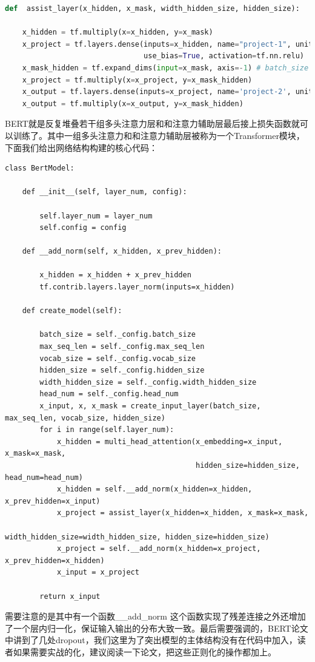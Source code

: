 \documentclass[twoside,a4paper,12pt]{book}%
\begin{document}
\begin{lstlisting}[language={Python}]
def  assist_layer(x_hidden, x_mask, width_hidden_size, hidden_size):

    x_hidden = tf.multiply(x=x_hidden, y=x_mask)
    x_project = tf.layers.dense(inputs=x_hidden, name="project-1", units=width_hidden_size, 
                                use_bias=True, activation=tf.nn.relu)
    x_mask_hidden = tf.expand_dims(input=x_mask, axis=-1) # batch_size x max_seq_len x 1
    x_project = tf.multiply(x=x_project, y=x_mask_hidden)
    x_output = tf.layers.dense(inputs=x_project, name='project-2', units=hidden_size)
    x_output = tf.multiply(x=x_output, y=x_mask_hidden)
\end{lstlisting}

\gls{BERT}就是反复堆叠若干组多头注意力层和和注意力辅助层最后接上损失函数就可以训练了。其中一组多头注意力和和注意力辅助层被称为一个Transformer模块，下面我们给出网络结构构建的核心代码：
\begin{lstlisting}
class BertModel:
    
    def __init__(self, layer_num, config):
        
        self.layer_num = layer_num
        self.config = config

    def __add_norm(self, x_hidden, x_prev_hidden):
        
        x_hidden = x_hidden + x_prev_hidden
        tf.contrib.layers.layer_norm(inputs=x_hidden)

    def create_model(self):
        
        batch_size = self._config.batch_size
        max_seq_len = self._config.max_seq_len
        vocab_size = self._config.vocab_size
        hidden_size = self._config.hidden_size
        width_hidden_size = self._config.width_hidden_size
        head_num = self._config.head_num
        x_input, x, x_mask = create_input_layer(batch_size, max_seq_len, vocab_size, hidden_size)
        for i in range(self.layer_num):
            x_hidden = multi_head_attention(x_embedding=x_input, x_mask=x_mask,
                                            hidden_size=hidden_size, head_num=head_num)
            x_hidden = self.__add_norm(x_hidden=x_hidden, x_prev_hidden=x_input)
            x_project = assist_layer(x_hidden=x_hidden, x_mask=x_mask,
                                     width_hidden_size=width_hidden_size, hidden_size=hidden_size)
            x_project = self.__add_norm(x_hidden=x_project, x_prev_hidden=x_hidden)
            x_input = x_project
        
        return x_input
\end{lstlisting}
需要注意的是其中有一个函数\_\_add\_norm 这个函数实现了残差连接之外还增加了一个层内归一化，保证输入输出的分布大致一致。最后需要强调的，\gls{BERT}论文中讲到了几处dropout，我们这里为了突出模型的主体结构没有在代码中加入，读者如果需要实战的化，建议阅读一下论文，把这些正则化的操作都加上。
\end{document}
